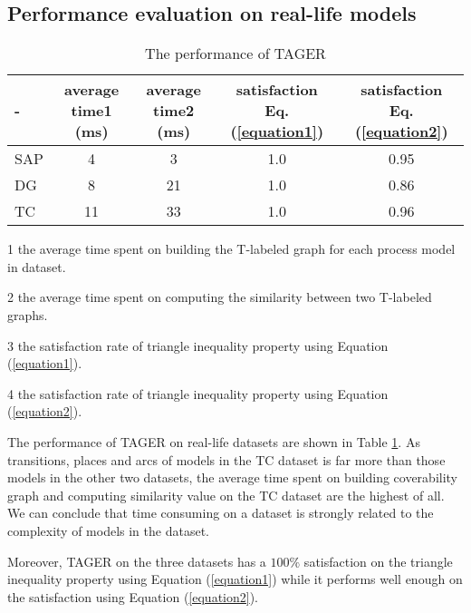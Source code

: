 \documentclass{llncs}
\begin{document}
\subsection{Performance evaluation on real-life models}\label{performanceResult}
\begin{table}[!htb]
\centering
\caption{ The performance of TAGER \label{result_s}}
\begin{threeparttable}
\begin{tabular}{|l|c|c|c|c|} \hline
 -  &average time1 (ms)\tnote{1} \quad& average time2 (ms)\tnote{2} \quad & satisfaction Eq.(\ref{equation1})\tnote{3} \quad & satisfaction Eq.(\ref{equation2})\tnote{4} \quad\\ \hline
 SAP& 4 & 3 & 1.0 & 0.95\\ \hline
DG & 8 & 21 & 1.0 & 0.86\\ \hline
TC & 11 & 33 & 1.0 & 0.96\\ \hline
\end{tabular}
\begin{minipage}{0.6\textwidth}
\begin{tablenotes}
	\footnotesize
	\item[1] the average time spent on building the T-labeled graph for each process model in dataset.			
    \item[2] the average time spent on computing the similarity between two T-labeled graphs.
	\item[3] the satisfaction rate of triangle inequality property using Equation (\ref{equation1}).
	\item[4] the satisfaction rate of triangle inequality property using Equation (\ref{equation2}).
\end{tablenotes}
\end{minipage}
\end{threeparttable}
\end{table}

The performance of TAGER on real-life datasets are shown in Table \ref{result_s}. As transitions, places and arcs of models in the TC dataset is far more than those models in the other two datasets, the average time spent on building coverability graph and computing similarity value on the TC dataset are the highest of all. We can conclude that time consuming on a dataset is strongly related to the complexity of models in the dataset.

Moreover, TAGER on the three datasets has a $100\%$ satisfaction on the triangle inequality property using Equation (\ref{equation1}) while it performs well enough on the satisfaction using Equation (\ref{equation2}).
\end{document}
